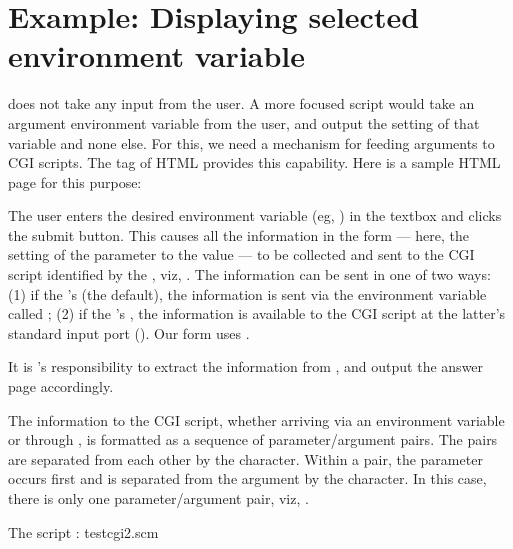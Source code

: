 \section{Example: Displaying selected environment variable}
\label{testcgi2}

 does not take any input from the user.
A more focused script would take an argument
environment variable from the user, and output the
setting of that variable and none else.  For this, we
need a mechanism for feeding arguments to CGI scripts.
The  tag of HTML provides this capability.
Here is a sample HTML page for this purpose:


\n The user enters the desired environment variable (eg,
)  in the
textbox and clicks the submit button.  This causes all
the information in the form --- here, the setting of
the parameter  to the value
 --- to be collected and sent to
the CGI script identified by the , viz,
.    The information can be sent in one
of two ways: (1) if the 's  (the
default), the information is sent via the environment
variable called ; (2) if the 's
, the information is available to the
CGI script at the latter's standard input port
().  Our form uses .

It is 's responsibility to extract the
information from
, and output the answer page
accordingly.

The information to the CGI script, whether arriving via
an environment variable or through , is
formatted as a sequence of parameter/argument pairs.
The pairs are separated from each other by the \p{&}
character.  Within a pair, the parameter occurs first
and is separated from the argument by the \p{=}
character.  In this case, there is only
one parameter/argument pair, viz,
.

The script :
\scmfilename testcgi2.scm

